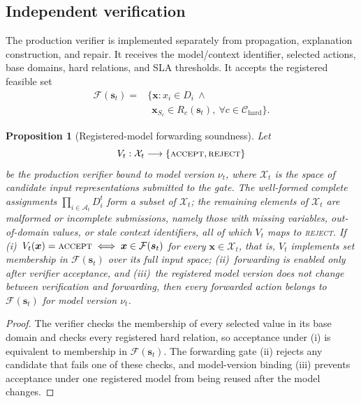 \documentclass[pdflatex,sn-mathphys-num,iicol,oneside]{sn-jnl}
\newtheorem{proposition}{Proposition}
\begin{document}
\subsection{Independent verification}
\label{sec:verifier}

The production verifier is implemented separately from propagation,
explanation construction, and repair. It receives the model/context
identifier, selected actions, base domains, hard relations, and SLA
thresholds. It accepts the registered feasible set
\begin{equation}
\begin{split}
\mathcal{F}(\bm{s}_t)
={}&
\bigl\{
\bm{x}:
x_i\in D_i
\ \land\\
&\ \
\bm{x}_{S_c}\in R_c(\bm{s}_t),
\
\forall c\in\mathcal{C}_{\mathrm{hard}}
\bigr\}.
\end{split}
\label{eq:feasible-set}
\end{equation}

\begin{proposition}[Registered-model forwarding soundness]
\label{prop:soundness}
Let
\begin{equation}
V_t:\mathcal{X}_t\longrightarrow
\{\textsc{accept},\textsc{reject}\}
\label{eq:verifier-signature}
\end{equation}
be the production verifier bound to model version $\nu_t$, where
$\mathcal{X}_t$ is the space of candidate input representations
submitted to the gate. The well-formed complete assignments
$\prod_{i\in\mathcal{A}_t}D_i^{t}$ form a subset of $\mathcal{X}_t$;
the remaining elements of $\mathcal{X}_t$ are malformed or incomplete
submissions, namely those with missing variables, out-of-domain
values, or stale context identifiers, all of which $V_t$ maps to
\textsc{reject}. If
(i)~$V_t(\bm{x})=\textsc{accept}\iff\bm{x}\in\mathcal{F}(\bm{s}_t)$
for every $\bm{x}\in\mathcal{X}_t$,
that is, $V_t$ implements set membership in $\mathcal{F}(\bm{s}_t)$
over its full input space;
(ii)~forwarding is enabled only after verifier acceptance, and
(iii)~the registered model version does not change between
verification and forwarding, then every forwarded action belongs to
$\mathcal{F}(\bm{s}_t)$ for model version $\nu_t$.
\end{proposition}

\begin{proof}
The verifier checks the membership of every selected value in its base
domain and checks every registered hard relation, so acceptance under
(i) is equivalent to membership in $\mathcal{F}(\bm{s}_t)$. The
forwarding gate (ii) rejects any candidate that fails one of these
checks, and model-version binding (iii) prevents acceptance under one
registered model from being reused after the model changes.
\end{proof}
\end{document}
